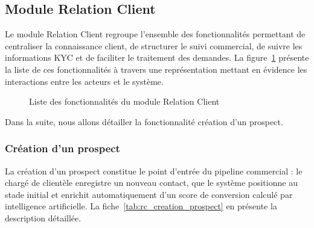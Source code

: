 \subsection{Module Relation Client}

Le module Relation Client regroupe l'ensemble des fonctionnalités permettant de centraliser
la connaissance client, de structurer le suivi commercial, de suivre les informations
KYC et de faciliter le traitement des demandes. La figure~\ref{fig:fonctionnalites_rc} présente la liste de ces fonctionnalités à travers une représentation mettant en évidence les interactions entre les acteurs et le système.


\begin{figure}[H]
    \centering
    \caption{Liste des fonctionnalités du module Relation Client}
    \label{fig:fonctionnalites_rc}
\end{figure}

Dans la suite, nous allons détailler la fonctionnalité création d'un prospect.


\subsubsection{Création d'un prospect}

La création d'un prospect constitue le point d'entrée du pipeline commercial : le chargé
de clientèle enregistre un nouveau contact, que le système positionne au stade initial et
enrichit automatiquement d'un score de conversion calculé par intelligence artificielle.
La fiche~\ref{tab:rc_creation_prospect} en présente la description détaillée.



